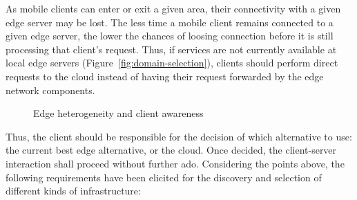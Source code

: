 As mobile clients can enter or exit a given area, their connectivity with a given edge server may be lost. The less time a mobile client remains connected to a given edge server, the lower the chances of loosing connection before it is still processing that client's request. Thus, if services are not currently available at local edge servers (Figure~\ref{fig:domain-selection}), clients should perform direct requests to the cloud instead of having their request forwarded by the edge network components. 

\begin{figure}[htbp]
	\centering
	\captionsetup[subfigure]{width=0.5\textwidth}	
	\null\hfill
	\captionsetup[subfigure]{width=0.45\textwidth}	
	\hfill
	\hfill\null
	\caption{Edge heterogeneity and client awareness}\label{fig:1}
\end{figure}

Thus, the client should be responsible for the decision of which alternative to use: the current best edge alternative, or the cloud. Once decided, the client-server interaction shall proceed without further ado.
Considering the points above, the following requirements have been elicited for the discovery and selection of different kinds of infrastructure:

